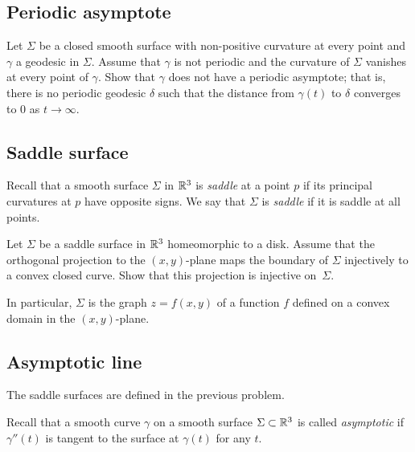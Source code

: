 \subsection*{Periodic asymptote}
\label{Asymptotic geodesic}

\begin{pr}
Let $\Sigma$ be a closed smooth surface with non-positive curvature at every point
and $\gamma$ a geodesic in $\Sigma$.
Assume that $\gamma$ is not periodic
and the curvature of $\Sigma$ vanishes at every point of $\gamma$.
Show that $\gamma$ does not have a periodic asymptote;
that is, there is no periodic geodesic $\delta$ such that the distance from $\gamma(t)$ to $\delta$  converges to $0$ as $t\to\infty$. 
\end{pr}

\subsection*{Saddle surface}
\label{Saddle surface}

Recall that a smooth surface $\Sigma$ in $\mathbb{R}^3$
is \emph{saddle} at a point $p$ if its principal curvatures at $p$ have opposite signs. 
We say that $\Sigma$ is {}\emph{saddle} if it is saddle at all points.

\begin{pr}
Let $\Sigma$ be a saddle surface in $\mathbb{R}^3$
homeomorphic to a disk.
Assume that the orthogonal projection to the $(x,y)$-plane
maps the boundary of $\Sigma$
injectively to a convex closed curve.
Show that this projection is injective on~$\Sigma$.

In particular, $\Sigma$ is the graph $z=f(x,y)$ of a function $f$ defined on a convex domain in the $(x,y)$-plane.
\end{pr}


\subsection*{Asymptotic line}
\label{asymptotic-line}

The saddle surfaces are defined in the previous problem.

Recall that a smooth curve $\gamma$ on a smooth surface $\Sigma\subset \mathbb{R}^3$ is called \emph{asymptotic} if $\gamma''(t)$ is tangent to the surface at $\gamma(t)$ for any $t$.

